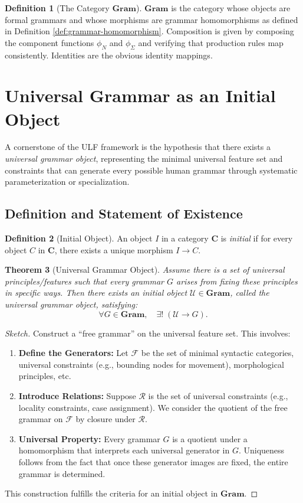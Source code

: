 \documentclass[12pt]{article}
\theoremstyle{plain}
\newtheorem{theorem}{Theorem}[section]
\theoremstyle{definition}
\newtheorem{definition}[theorem]{Definition}
\begin{document}
\begin{definition}[The Category \(\mathbf{Gram}\)]
\(\mathbf{Gram}\) is the category whose objects are formal grammars and whose morphisms are grammar homomorphisms as defined in Definition \ref{def:grammar-homomorphism}. Composition is given by composing the component functions \(\phi_N\) and \(\phi_\Sigma\) and verifying that production rules map consistently. Identities are the obvious identity mappings.
\end{definition}

\section{Universal Grammar as an Initial Object}
A cornerstone of the ULF framework is the hypothesis that there exists a \emph{universal grammar object}, representing the minimal universal feature set and constraints that can generate every possible human grammar through systematic parameterization or specialization.

\subsection{Definition and Statement of Existence}
\begin{definition}[Initial Object]
An object \(I\) in a category \(\mathbf{C}\) is \emph{initial} if for every object \(C\) in \(\mathbf{C}\), there exists a unique morphism \(I \to C\).
\end{definition}

\begin{theorem}[Universal Grammar Object]\label{thm:UG}
Assume there is a set of universal principles/features such that every grammar \(G\) arises from fixing these principles in specific ways. Then there exists an \emph{initial object} \(\mathcal{U} \in \mathbf{Gram}\), called the \emph{universal grammar object}, satisfying:
\[
\forall G \in \mathbf{Gram}, \quad \exists! \; (\mathcal{U} \to G).
\]
\end{theorem}

\begin{proof}[Sketch]
Construct a ``free grammar'' on the universal feature set. This involves:
\begin{enumerate}
    \item \textbf{Define the Generators:} Let \(\mathcal{F}\) be the set of minimal syntactic categories, universal constraints (e.g., bounding nodes for movement), morphological principles, etc.
    \item \textbf{Introduce Relations:} Suppose \(\mathcal{R}\) is the set of universal constraints (e.g., locality constraints, case assignment). We consider the quotient of the free grammar on \(\mathcal{F}\) by closure under \(\mathcal{R}\).
    \item \textbf{Universal Property:} Every grammar \(G\) is a quotient under a homomorphism that interprets each universal generator in \(G\). Uniqueness follows from the fact that once these generator images are fixed, the entire grammar is determined.
\end{enumerate}
This construction fulfills the criteria for an initial object in \(\mathbf{Gram}\).
\end{proof}
\end{document}
